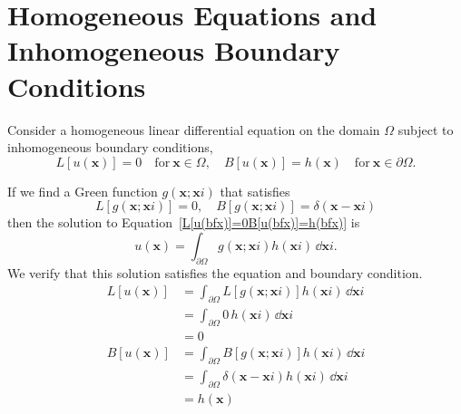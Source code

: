 \section{Homogeneous Equations and Inhomogeneous Boundary Conditions}


Consider a homogeneous linear differential equation on the domain $\Omega$
subject to inhomogeneous boundary conditions,
\begin{equation}
  \label{L[u(bfx)]=0B[u(bfx)]=h(bfx)}
  L[u(\mathbf{x})] = 0 \quad \mathrm{for}\ \mathbf{x} \in \Omega, \quad
  B[u(\mathbf{x})] = h(\mathbf{x}) \quad \mathrm{for}\ \mathbf{x} \in \partial \Omega.
\end{equation}



If we find a Green function $g(\mathbf{x}; \mathbf{x}i)$ that satisfies
\[ 
L[g(\mathbf{x};\mathbf{x}i)] = 0, \quad 
B[g(\mathbf{x};\mathbf{x}i)] = \delta(\mathbf{x}-\mathbf{x}i)
\]
then the solution to Equation~\ref{L[u(bfx)]=0B[u(bfx)]=h(bfx)} is
\[ 
u(\mathbf{x}) = \int_{\partial \Omega} g(\mathbf{x};\mathbf{x}i) h(\mathbf{x}i)\,\dd \mathbf{x}i. 
\]
We verify that this solution satisfies the equation and boundary condition.
\begin{align*}
  L[u(\mathbf{x})] &= \int_{\partial \Omega} L[g(\mathbf{x};\mathbf{x}i)] h(\mathbf{x}i)\,\dd \mathbf{x}i \\
  &= \int_{\partial \Omega} 0\, h(\mathbf{x}i)\,\dd \mathbf{x}i \\
  &= 0 \\
  B[u(\mathbf{x})] &= \int_{\partial \Omega} B[g(\mathbf{x};\mathbf{x}i)] h(\mathbf{x}i)\,\dd \mathbf{x}i \\
  &= \int_{\partial \Omega} \delta(\mathbf{x}-\mathbf{x}i) h(\mathbf{x}i)\,\dd \mathbf{x}i \\
  &= h(\mathbf{x})
\end{align*}






